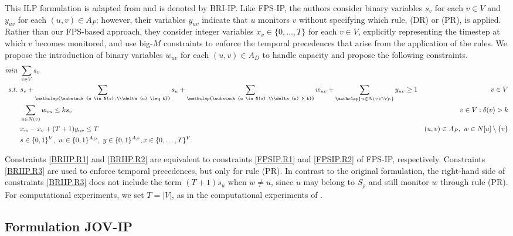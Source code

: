 \documentclass{article}
\newcommand{\FPSIP}{FPS-IP\xspace}
\newcommand{\BRIIP}{BRI-IP\xspace}
\newcommand{\JOVIP}{JOV-IP\xspace}
\begin{document}
This ILP formulation is adapted from \citet{Brimkov2019} and is denoted by \BRIIP.
Like \FPSIP, the authors consider binary variables $s_v$ for each $v \in V$ and $y_{uv}$ for each $(u,v) \in A_P$; however, their variables $y_{uv}$ indicate that $u$ monitors $v$ without specifying which rule, (DR) or (PR), is applied.
Rather than our FPS-based approach, they consider integer variables $x_v \in \{0,\ldots,T\}$ for each $v \in V$, explicitly representing the timestep at which $v$ becomes monitored, and use big-$M$ constraints to enforce the temporal precedences that arise from the application of the rules.
We propose the introduction of binary variables $w_{uv}$ for each $(u,v) \in A_D$ to handle capacity and propose the following constraints.
{\small
\begin{align}
min\  & \sum_{v \in V} s_v \label{BRIIP.ObjFun}\\ 
s.t.\ & s_v + \sum_{\mathclap{\substack{u \in N(v):\\\delta(u) \leq k}}} s_u + \sum_{\mathclap{\substack{u \in N(v):\\\delta(u) > k}}} w_{uv} + \sum_{\mathclap{u \in N(v) \cap V_P}} y_{uv} \geq 1 & v \in V \label{BRIIP.R1}\\
& \sum_{u \in N(v)} w_{vu} \leq ks_v & v \in V: \delta(v) > k \label{BRIIP.R2}\\
& x_w - x_v + (T+1)y_{uv} \leq T & (u,v) \in A_P,\ w \in N[u] \setminus \{v\} \label{BRIIP.R3}\\
& s \in \{0,1\}^V,\ w \in \{0,1\}^{A_D},\ y \in \{0,1\}^{A_P}, x \in \{0,\ldots,T\}^V. \span \notag
\end{align}
}

Constraints \eqref{BRIIP.R1} and \eqref{BRIIP.R2} are equivalent to constraints \eqref{FPSIP.R1} and \eqref{FPSIP.R2} of \FPSIP, respectively.
Constraints \eqref{BRIIP.R3} are used to enforce temporal precedences, but only for rule (PR).
In contrast to the original formulation, the right-hand side of constraints \eqref{BRIIP.R3} does not include the term $(T+1)s_u$ when $w \neq u$, since $u$ may belong to $S_{\rho}$ and still monitor $w$ through rule (PR).
For computational experiments, we set $T = |V|$, as in the computational experiments of \citet{Brimkov2019}. 

\subsection{Formulation \JOVIP}
\end{document}
